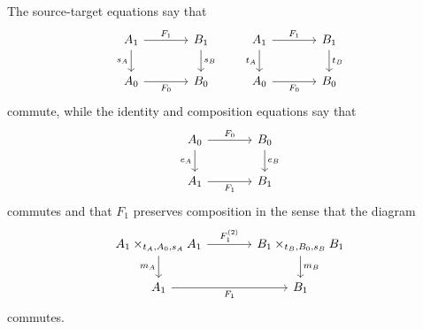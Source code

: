 \begin{definition}
    The source-target equations say that
    \[
        \begin{tikzcd}[column sep=large]
                A_1
                    \arrow[r, "F_1"]
                    \arrow[d, "s_A"']
            &
                B_1
                    \arrow[d, "s_B"]
            \\
                A_0
                    \arrow[r, "F_0"']
            &
                B_0
        \end{tikzcd}
        \qquad
        \begin{tikzcd}[column sep=large]
                A_1
                    \arrow[r, "F_1"]
                    \arrow[d, "t_A"']
            &
                B_1
                    \arrow[d, "t_B"]
            \\
                A_0
                    \arrow[r, "F_0"']
            &
                B_0
        \end{tikzcd}
    \]
    commute, while the identity and composition equations say that
    \[
        \begin{tikzcd}[column sep=large]
                A_0
                    \arrow[r, "F_0"]
                    \arrow[d, "e_A"']
            &
                B_0
                    \arrow[d, "e_B"]
            \\
                A_1
                    \arrow[r, "F_1"']
            &
                B_1
        \end{tikzcd}
    \]
    commutes and that \(F_1\) preserves composition in the sense that the diagram
    \[
        \begin{tikzcd}[column sep=large]
                A_1\times_{t_A,A_0,s_A}A_1
                    \arrow[r, "F_1^{(2)}"]
                    \arrow[d, "m_A"']
            &
                B_1\times_{t_B,B_0,s_B}B_1
                    \arrow[d, "m_B"]
            \\
                A_1
                    \arrow[r, "F_1"']
            &
                B_1
        \end{tikzcd}
    \]
    commutes.
\end{definition}

